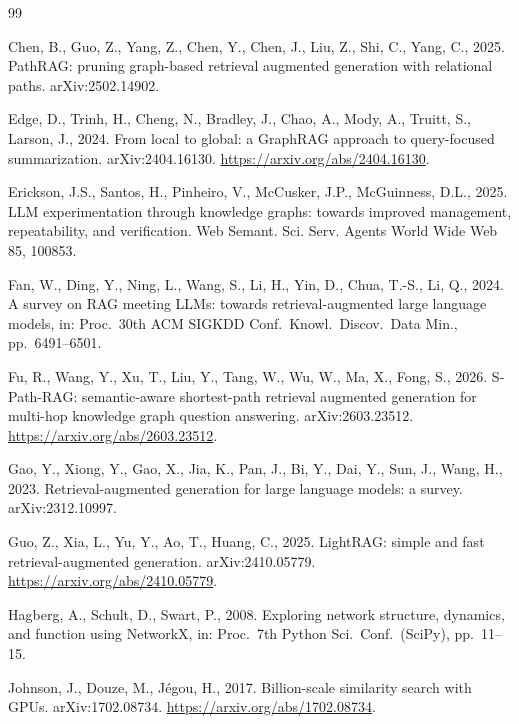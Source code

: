 \documentclass[12pt,a4paper,oneside]{report}
\begin{document}
\clearpage
\renewcommand{\bibname}{References}
\begin{thebibliography}{99}
\setlength{\itemsep}{4pt}

Chen, B., Guo, Z., Yang, Z., Chen, Y., Chen, J., Liu, Z., Shi, C., Yang,
C., 2025. PathRAG: pruning graph-based retrieval augmented generation
with relational paths. arXiv:2502.14902.

Edge, D., Trinh, H., Cheng, N., Bradley, J., Chao, A., Mody, A., Truitt,
S., Larson, J., 2024. From local to global: a GraphRAG approach to
query-focused summarization. arXiv:2404.16130.
\url{https://arxiv.org/abs/2404.16130}.

Erickson, J.S., Santos, H., Pinheiro, V., McCusker, J.P., McGuinness,
D.L., 2025. LLM experimentation through knowledge graphs: towards
improved management, repeatability, and verification. Web Semant. Sci.
Serv. Agents World Wide Web 85, 100853.

Fan, W., Ding, Y., Ning, L., Wang, S., Li, H., Yin, D., Chua, T.-S., Li,
Q., 2024. A survey on RAG meeting LLMs: towards retrieval-augmented
large language models, in: Proc.\ 30th ACM SIGKDD Conf.\ Knowl.\ Discov.\
Data Min., pp.\ 6491--6501.

Fu, R., Wang, Y., Xu, T., Liu, Y., Tang, W., Wu, W., Ma, X., Fong, S.,
2026. S-Path-RAG: semantic-aware shortest-path retrieval augmented
generation for multi-hop knowledge graph question answering.
arXiv:2603.23512.
\url{https://arxiv.org/abs/2603.23512}.

Gao, Y., Xiong, Y., Gao, X., Jia, K., Pan, J., Bi, Y., Dai, Y., Sun, J.,
Wang, H., 2023. Retrieval-augmented generation for large language
models: a survey. arXiv:2312.10997.

Guo, Z., Xia, L., Yu, Y., Ao, T., Huang, C., 2025. LightRAG: simple and
fast retrieval-augmented generation. arXiv:2410.05779.
\url{https://arxiv.org/abs/2410.05779}.

Hagberg, A., Schult, D., Swart, P., 2008. Exploring network structure,
dynamics, and function using NetworkX, in: Proc.\ 7th Python Sci.\
Conf.\ (SciPy), pp.\ 11--15.

Johnson, J., Douze, M., J\'{e}gou, H., 2017. Billion-scale similarity
search with GPUs. arXiv:1702.08734.
\url{https://arxiv.org/abs/1702.08734}.


\end{thebibliography}
\end{document}
